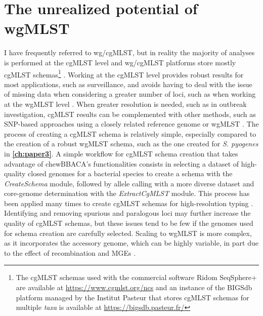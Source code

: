 \section{The unrealized potential of wgMLST}

I have frequently referred to \ac{wg/cgMLST}, but in reality the majority of analyses is performed at the \ac{cgMLST} level and \ac{wg/cgMLST} platforms store mostly \ac{cgMLST} schemas\footnote{The \ac{cgMLST} schemas used with the commercial software Ridom SeqSphere+ are available at \url{https://www.cgmlst.org/ncs} and an instance of the \ac{BIGSdb} platform managed by the Institut Pasteur that stores \ac{cgMLST} schemas for multiple \textit{taxa} is available at \url{https://bigsdb.pasteur.fr/}} \cite{jolley_open-access_2018, dyer_enterobase_2025}. Working at the \ac{cgMLST} level provides robust results for most applications, such as surveillance, and avoids having to deal with the issue of missing data when considering a greater number of loci, such as when working at the \ac{wgMLST} level \cite{leeper_evaluation_2023, uelze_typing_2020}. When greater resolution is needed, such as in outbreak investigation, \ac{cgMLST} results can be complemented with other methods, such as \ac{SNP}-based approaches using a closely related reference genome or \ac{wgMLST} \cite{mixao_multi-country_2025, leeper_validation_2025, leeper_evaluation_2023}. The process of creating a \ac{cgMLST} schema is relatively simple, especially compared to the creation of a robust \ac{wgMLST} schema, such as the one created for \textit{S. pyogenes} in \textbf{\autoref{ch:paper3}}. A simple workflow for \ac{cgMLST} schema creation that takes advantage of chewBBACA's functionalities consists in selecting a dataset of high-quality closed genomes for a bacterial species to create a schema with the \textit{CreateSchema} module, followed by allele calling with a more diverse dataset and core-genome determination with the \textit{ExtractCgMLST} module. This process has been applied many times to create \ac{cgMLST} schemas for high-resolution typing \cite{tourasse_core_2023, de_sales_core_2020, hershko_construction_2024, kozak_core_2025, crestani_microevolution_2025, carneiro_genome-scale_2023, thorell_helicobacter_2023, feng_population_2024, jansen_van_rensburg_development_2024}. Identifying and removing spurious and paralogous loci may further increase the quality of \ac{cgMLST} schemas, but these issues tend to be few if the genomes used for schema creation are carefully selected. Scaling to \ac{wgMLST} is more complex, as it incorporates the accessory genome, which can be highly variable, in part due to the effect of recombination and \ac{MGEs} \cite{medini_microbial_2005, tettelin_genome_2005, costa_first_2020}.


